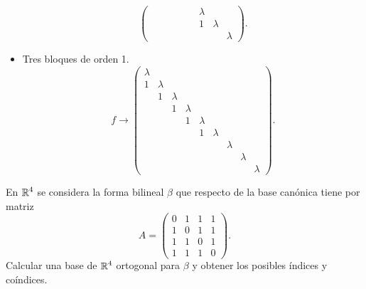 \documentclass{article}
\begin{document}
\begin{sol}
\begin{itemize}
\[\begin{pmatrix}
	  & & & & & & \lambda & & \\
	  & & & & & & 1 & \lambda & \\
	  & & & & & & & & \lambda\end{pmatrix} .\]
\item Tres bloques de orden 1.
	\[f \to \begin{pmatrix} \lambda & & & & & & & & \\
		1 & \lambda & & & & & & & \\
	  & 1 & \lambda & & & & & &\\
	  & & 1 & \lambda & & & & & \\
	  & & & 1 & \lambda & & & & \\
	  & & & & 1 & \lambda & & & \\
	  & & & & & & \lambda & & \\
	  & & & & & & & \lambda & \\
	  & & & & & & & & \lambda\end{pmatrix} .\]
\end{itemize}
\end{sol}
\begin{ej}
En $\displaystyle \mathbb{R}^{4} $ se considera la forma bilineal $\displaystyle \beta  $ que respecto de la base canónica tiene por matriz
\[A = \begin{pmatrix} 0 & 1 & 1 & 1 \\
1 & 0 & 1 & 1 \\
1 & 1 & 0 & 1 \\
1 & 1 & 1 & 0\end{pmatrix} .\]
Calcular una base de $\displaystyle \mathbb{R}^{4} $ ortogonal para $\displaystyle \beta  $ y obtener los posibles índices y coíndices.
\end{ej}
\end{document}
